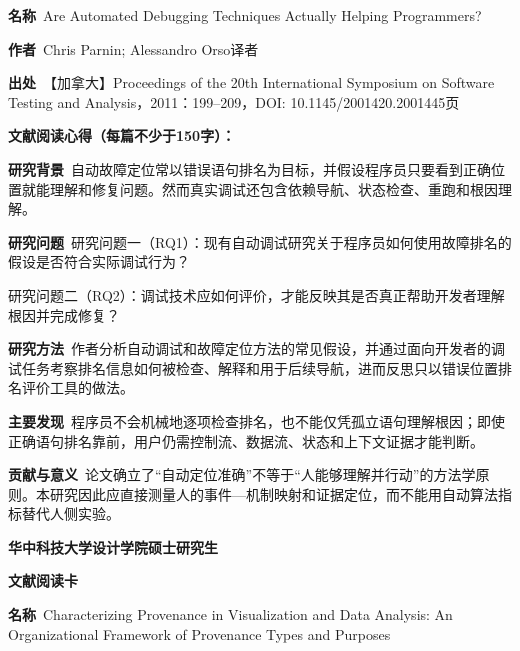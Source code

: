 \vspace{0.35em}
\noindent\textbf{名称}\ Are Automated Debugging Techniques Actually Helping Programmers?\par
\noindent\textbf{作者}\ Chris Parnin; Alessandro Orso\quad 译者\par
\noindent\textbf{出处}\ 【加拿大】Proceedings of the 20th International Symposium on Software Testing and Analysis，2011：199–209，DOI: 10.1145/2001420.2001445\quad 页\par
\vspace{0.35em}
\noindent\textbf{文献阅读心得（每篇不少于150字）：}\par
\noindent\textbf{研究背景}\ 自动故障定位常以错误语句排名为目标，并假设程序员只要看到正确位置就能理解和修复问题。然而真实调试还包含依赖导航、状态检查、重跑和根因理解。\par
\noindent\textbf{研究问题}\ 研究问题一（RQ1）：现有自动调试研究关于程序员如何使用故障排名的假设是否符合实际调试行为？\par
研究问题二（RQ2）：调试技术应如何评价，才能反映其是否真正帮助开发者理解根因并完成修复？\par
\noindent\textbf{研究方法}\ 作者分析自动调试和故障定位方法的常见假设，并通过面向开发者的调试任务考察排名信息如何被检查、解释和用于后续导航，进而反思只以错误位置排名评价工具的做法。\par
\noindent\textbf{主要发现}\ 程序员不会机械地逐项检查排名，也不能仅凭孤立语句理解根因；即使正确语句排名靠前，用户仍需控制流、数据流、状态和上下文证据才能判断。\par
\noindent\textbf{贡献与意义}\ 论文确立了“自动定位准确”不等于“人能够理解并行动”的方法学原则。本研究因此应直接测量人的事件—机制映射和证据定位，而不能用自动算法指标替代人侧实验。\par
\clearpage
\begin{center}
{\songti\bfseries\fontsize{18.5pt}{27.75pt}\selectfont 华中科技大学设计学院硕士研究生\par}
{\songti\bfseries\fontsize{18.5pt}{27.75pt}\selectfont 文献阅读卡\par}
\end{center}
\vspace{0.25em}
\noindent\underline{}\par
\vspace{0.35em}
\noindent\textbf{名称}\ Characterizing Provenance in Visualization and Data Analysis: An Organizational Framework of Provenance Types and Purposes\par

